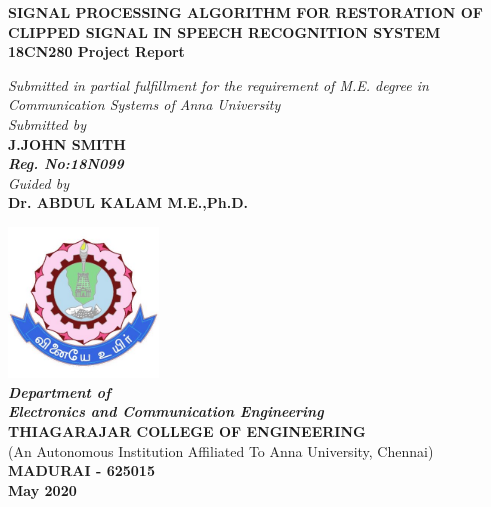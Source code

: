 \documentclass[a4paper,12pt]{report} %
\makeatletter
\newcommand\frontmatter{%
    \cleardoublepage
  \pagenumbering{roman}}
\makeatother
\begin{document}
\frontmatter
{}

\begin{titlepage}
   \begin{center}
 
   \Large
   {\textbf{SIGNAL PROCESSING ALGORITHM FOR
RESTORATION OF CLIPPED SIGNAL IN SPEECH RECOGNITION SYSTEM}}\\
 \large
       \vspace{0.5cm}
        \textbf{18CN280 Project Report }
 
   \vspace{1cm}
  \large
    \textit{Submitted in partial fulfillment for the requirement of M.E. degree in\\
        Communication Systems of Anna University}\\
         \vspace{0.75cm}
  \textit{Submitted by}\\
       \textbf{J.JOHN SMITH}\\
       \textit{\textbf{Reg. No:18N099}}\\
          \vspace{0.5cm}
         \textit{Guided by}\\
       \textbf{Dr. ABDUL KALAM M.E.,Ph.D.}\\
 
       \vfill
 
 
       \includegraphics[width=0.3\textwidth]{TCE}\\
  \large\textit{\textbf{Department of\\ Electronics and Communication Engineering}}\\
      \Large\textbf{THIAGARAJAR COLLEGE OF ENGINEERING}\\
       \normalsize (An Autonomous Institution Affiliated To Anna University, Chennai)\\
        \Large\textbf{MADURAI - 625015}\\
       \large \textbf{May 2020}
 
   \end{center}
\end{titlepage}
\setcounter{secnumdepth}{-2}
\end{document}
